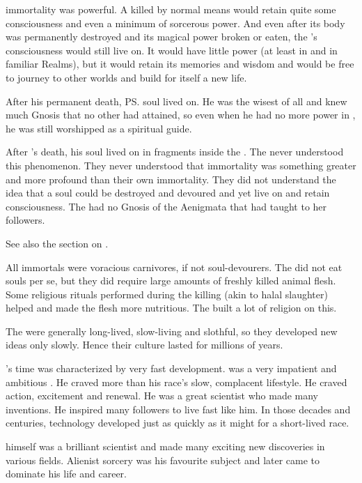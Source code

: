 \Draconian immortality was powerful. 
A \dragon killed by normal means would retain quite some consciousness and even a minimum of sorcerous power. 
And even after its body was permanently destroyed and its magical power broken or eaten, the \dragon's consciousness would still live on. 
It would have little power (at least in \Miith and in familiar Realms), but it would retain its memories and wisdom and would be free to journey to other worlds and build for itself a new life. 

After his permanent death, \ps{\Sethicus} soul lived on. 
He was the wisest of all \dragons and knew much Gnosis that no other \dragon had attained, so even when he had no more power in \Miith, he was still worshipped as a spiritual guide. 

After \Nexagglachel's death, his soul lived on in fragments inside the \satharioth.
The \resphain never understood this phenomenon. 
They never understood that \draconian immortality was something greater and more profound than their own immortality.
They did not understand the idea that a soul could be destroyed and devoured and yet live on and retain consciousness. 
The \resphain had no Gnosis of the Aenigmata that \KhothSell had taught to her followers.

See also the section on . 


All immortals were voracious carnivores, if not soul-devourers. 
The \aryothim did not eat souls per se, but they did require large amounts of freshly killed animal flesh. 
Some religious rituals performed during the killing (akin to halal slaughter) helped and made the flesh more nutritious.
The \aryothim built a lot of religion on this. 


The \ophidians were generally long-lived, slow-living and slothful, so they developed new ideas only slowly. 
Hence their culture lasted for millions of years.

\Sethicus's time was characterized by very fast development. 
\Sethicus was a very impatient and ambitious \ophidian.
He craved more than his race's slow, complacent lifestyle.
He craved action, excitement and renewal.
He was a great scientist who made many inventions.
He inspired many followers to live fast like him. 
In those decades and centuries, technology developed just as quickly as it might for a short-lived race.

\Sethicus himself was a brilliant scientist and made many exciting new discoveries in various fields. 
Alienist sorcery was his favourite subject and later came to dominate his life and career. 

